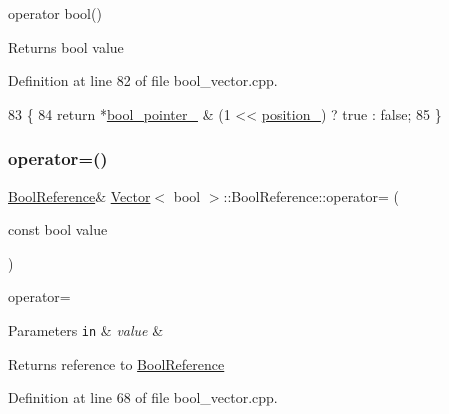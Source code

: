 operator bool() 

\begin{DoxyReturn}{Returns}
bool value 
\end{DoxyReturn}


Definition at line 82 of file bool\+\_\+vector.\+cpp.


\begin{DoxyCode}
83                             \{
84                                 \textcolor{keywordflow}{return}  *\hyperlink{classVector_3_01bool_01_4_1_1BoolReference_ad9fc66c2a80d7351e5829e321c4d46f0}{bool\_pointer\_} & (1 << 
      \hyperlink{classVector_3_01bool_01_4_1_1BoolReference_a88f229e6c448c4e7f34381247eb7f2b8}{position\_}) ? \textcolor{keyword}{true} : \textcolor{keyword}{false};
85                             \}
\end{DoxyCode}
\mbox{\label{classVector_3_01bool_01_4_1_1BoolReference_a5d76de9a5ad35583fe447af9951d1491}} 
\subsubsection{\texorpdfstring{operator=()}{operator=()}}
{\footnotesize\ttfamily \hyperlink{classVector_3_01bool_01_4_1_1BoolReference_a7b319cb4b874379cbeb6d303b5d323eb}{Bool\+Reference}\& \hyperlink{classVector}{Vector}$<$ bool $>$\+::Bool\+Reference\+::operator= (\begin{DoxyParamCaption}\item[{const bool}]{value }\end{DoxyParamCaption})\hspace{0.3cm}{\ttfamily [inline]}}



operator= 


\begin{DoxyParams}[1]{Parameters}
\mbox{\tt in}  & {\em value} & \\
\hline
\end{DoxyParams}
\begin{DoxyReturn}{Returns}
reference to \hyperlink{classVector_3_01bool_01_4_1_1BoolReference}{Bool\+Reference} 
\end{DoxyReturn}


Definition at line 68 of file bool\+\_\+vector.\+cpp.


